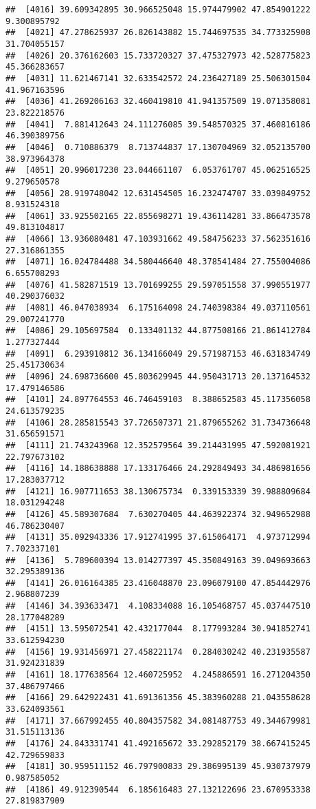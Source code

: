 \documentclass[
]{article}
\begin{document}
\begin{verbatim}
##  [4016] 39.609342895 30.966525048 15.974479902 47.854901222  9.300895792
##  [4021] 47.278625937 26.826143882 15.744697535 34.773325908 31.704055157
##  [4026] 20.376162603 15.733720327 37.475327973 42.528775823 45.366283657
##  [4031] 11.621467141 32.633542572 24.236427189 25.506301504 41.967163596
##  [4036] 41.269206163 32.460419810 41.941357509 19.071358081 23.822218576
##  [4041]  7.881412643 24.111276085 39.548570325 37.460816186 46.390389756
##  [4046]  0.710886379  8.713744837 17.130704969 32.052135700 38.973964378
##  [4051] 20.996017230 23.044661107  6.053761707 45.062516525  9.279650578
##  [4056] 28.919748042 12.631454505 16.232474707 33.039849752  8.931524318
##  [4061] 33.925502165 22.855698271 19.436114281 33.866473578 49.813104817
##  [4066] 13.936080481 47.103931662 49.584756233 37.562351616 27.316861355
##  [4071] 16.024784488 34.580446640 48.378541484 27.755004086  6.655708293
##  [4076] 41.582871519 13.701699255 29.597051558 37.990551977 40.290376032
##  [4081] 46.047038934  6.175164098 24.740398384 49.037110561 29.007241770
##  [4086] 29.105697584  0.133401132 44.877508166 21.861412784  1.277327444
##  [4091]  6.293910812 36.134166049 29.571987153 46.631834749 25.451730634
##  [4096] 24.698736600 45.803629945 44.950431713 20.137164532 17.479146586
##  [4101] 24.897764553 46.746459103  8.388652583 45.117356058 24.613579235
##  [4106] 28.285815543 37.726507371 21.879655262 31.734736648 31.656591571
##  [4111] 21.743243968 12.352579564 39.214431995 47.592081921 22.797673102
##  [4116] 14.188638888 17.133176466 24.292849493 34.486981656 17.283037712
##  [4121] 16.907711653 38.130675734  0.339153339 39.988809684 18.031294248
##  [4126] 45.589307684  7.630270405 44.463922374 32.949652988 46.786230407
##  [4131] 35.092943336 17.912741995 37.615064171  4.973712994  7.702337101
##  [4136]  5.789600394 13.014277397 45.350849163 39.049693663 32.295389136
##  [4141] 26.016164385 23.416048870 23.096079100 47.854442976  2.968807239
##  [4146] 34.393633471  4.108334088 16.105468757 45.037447510 28.177048289
##  [4151] 13.595072541 42.432177044  8.177993284 30.941852741 33.612594230
##  [4156] 19.931456971 27.458221174  0.284030242 40.231935587 31.924231839
##  [4161] 18.177638564 12.460725952  4.245886591 16.271204350 37.486797466
##  [4166] 29.642922431 41.691361356 45.383960288 21.043558628 33.624093561
##  [4171] 37.667992455 40.804357582 34.081487753 49.344679981 31.515113136
##  [4176] 24.843331741 41.492165672 33.292852179 38.667415245 42.729659833
##  [4181] 30.959511152 46.797900833 29.386995139 45.930737979  0.987585052
##  [4186] 49.912390544  6.185616483 27.132122696 23.670953338 27.819837909

\end{verbatim}
\end{document}

